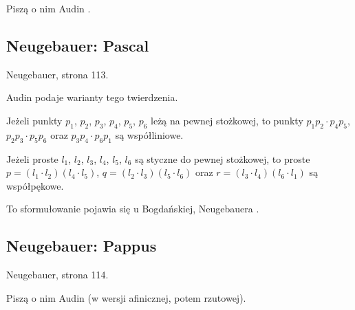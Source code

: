 Piszą o nim Audin \cite[s. 26, 151]{audin_2003}.

\subsection{Neugebauer: Pascal}

\begin{proposition}
	Neugebauer, strona 113.
\end{proposition}

Audin \cite[s. 103, 107, 209]{audin_2003} podaje warianty tego twierdzenia.

\begin{theorem}[Pascala]
	Jeżeli punkty $p_1$, $p_2$, $p_3$, $p_4$, $p_5$, $p_6$ leżą na pewnej stożkowej, to punkty $p_1p_2 \cdot p_4p_5$, $p_2p_3 \cdot p_5p_6$ oraz $p_3p_4 \cdot p_6p_1$ są współliniowe.
\end{theorem}

\begin{theorem}[Brianchona]
	Jeżeli proste $l_1$, $l_2$, $l_3$, $l_4$, $l_5$, $l_6$ są styczne do pewnej stożkowej, to proste $p = (l_1 \cdot l_2)(l_4 \cdot l_5)$, $q = (l_2 \cdot l_3)(l_5 \cdot l_6)$ oraz $r = (l_3 \cdot l_4)(l_6 \cdot l_1)$ są współpękowe.
\end{theorem}


To sformułowanie pojawia się u Bogdańskiej, Neugebauera \cite[s. 265, 266]{neugebauer_2018}.


\subsection{Neugebauer: Pappus}

\begin{proposition}
	Neugebauer, strona 114.
\end{proposition}
Piszą o nim Audin \cite[s. 25, 151, 171]{audin_2003} (w wersji afinicznej, potem rzutowej).




